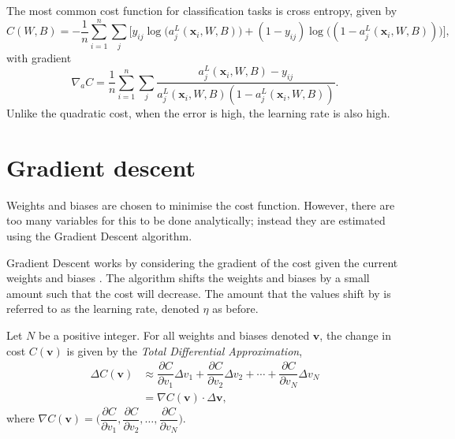 The most common cost function for classification tasks is cross entropy, given by
\[
	C(W,B) = -\dfrac{1}{n}\sum_{i=1}^n\sum_j\big[y_{ij}\log\big(a_j^L(\mathbf{x}_i,W,B)\big) + (1 - y_{ij})\log\big( (1 - a_j^L(\mathbf{x}_i,W,B))\big)\big],
\]
with gradient
\[
	\nabla_aC = \dfrac{1}{n}\sum_{i=1}^n\sum_j\dfrac{a_j^L(\mathbf{x}_i,W,B) - y_{ij}}{a_j^L(\mathbf{x}_i,W,B)(1-a_j^L(\mathbf{x}_i,W,B))}.
\]
Unlike the quadratic cost, when the error is high, the learning rate is also high.


\section{Gradient descent}\label{nnets-graddesc}

Weights and biases are chosen to minimise the cost function. However, there are too many variables for this to be done analytically; instead they are estimated using the Gradient Descent algorithm.

Gradient Descent works by considering the gradient of the cost given the current weights and biases \cite{Nielson2015}. The algorithm shifts the weights and biases by a small amount such that the cost will decrease. The amount that the values shift by is referred to as the learning rate, denoted $\eta$ as before.

Let $N$ be a positive integer. For all weights and biases denoted $\mathbf{v}$, the change in cost $C(\mathbf{v})$ is given by the \textit{Total Differential Approximation},
\begin{align*}
	\Delta C(\mathbf{v}) & \approx \dfrac{\partial C}{\partial v_1}\Delta v_1 + \dfrac{\partial C}{\partial v_2}\Delta v_2 + \cdots + \dfrac{\partial C}{\partial v_N}\Delta v_N\\
	& = \nabla C(\mathbf{v})\cdot \Delta \mathbf{v},
\end{align*}
where $\nabla C(\mathbf{v}) = \Big(\dfrac{\partial C}{\partial v_1}, \dfrac{\partial C}{\partial v_2},\ldots, \dfrac{\partial C}{\partial v_N}\Big)$.

